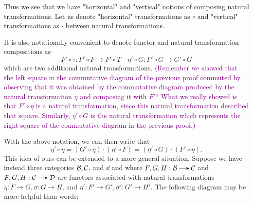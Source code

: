     \textcolor{NavyBlue}{Thus we see that we have "horizontal" and "vertical" notions of
    composing natural transformations. Let us denote "horizontal"
    transformations as $\circ$ and "vertical" transformations as
    $\cdot$ between natural transformations.} 

    It is also notationally convenient to denote functor and natural
    transformation compositions as 
    \[
        F' \circ \tau : F' \circ F \to F' \circ T  \quad \eta' \circ G: F' \circ G \to G' \circ G
    \]
    which are two additional natural transformations. \textcolor{purple}{(Remember we
    showed that the left square in the commutative diagram of the
    previous proof commuted by observing that it was obtained by the
    commutative diagram produced by the natural transformation $\eta$
    and composing it with $F'$? What we really showed is that $F' \circ
    \eta$ is a natural transformation, since this natural
    transformation described that square. Similarly, $\eta' \circ G$ is
    the natural transformation which represents the right square of
    the commutative diagram in the previous proof.)}

    With the above notation, we can then write that 
    \[
        \eta' \circ \eta = (G' \circ \eta) \cdot (\eta' \circ F) = (\eta' \circ G) \cdot (F' \circ \eta).       
    \]
    This idea of ours can be extended to a more general situation.
    Suppose we have instead three categories $\mathcal{B}, \mathcal{C}$, and $\dd$ and
    where $F, G, H: \bb \to \cc$ and $F, G, H: \cc \to \dd$ are
    functors associated with natural transformations $\eta: F \to G,
    \sigma : G \to H$, and $\eta': F' \to G', \sigma': G' \to H'$. The
    following diagram may be more helpful than words:
    \\

    \begin{minipage}{0.65\textwidth}
    \begin{center}
        \end{center}
        \hspace{7cm}   
    \end{minipage}
    \vspace{-0.5cm} 

